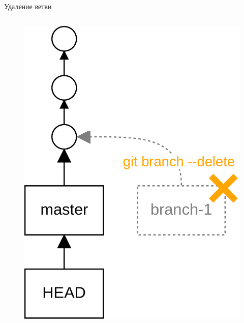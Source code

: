 \documentclass[presentation]{beamer}
\begin{document}
\begin{frame}[fragile]{Удаление ветви}
\begin{columns}
\begin{column}{.6\textwidth}
\begin{figure}[htb]
          \includegraphics[height=.7\textheight]{git-operation-merge-1-3}
        \end{figure}
      \end{column}
    \end{columns}
\end{frame}
\end{document}
